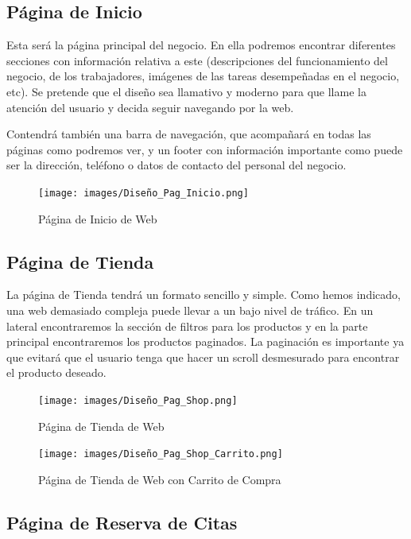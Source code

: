\subsection{Página de Inicio}

Esta será la página principal del negocio. En ella podremos encontrar diferentes secciones con información relativa a este (descripciones del funcionamiento del negocio, de los trabajadores, imágenes de las tareas desempeñadas en el negocio, etc). Se pretende que el diseño sea llamativo y moderno para que llame la atención del usuario y decida seguir navegando por la web.

Contendrá también una barra de navegación, que acompañará en todas las páginas como podremos ver, y un footer con información importante como puede ser la dirección, teléfono o datos de contacto del personal del negocio.

\begin{figure}[H]
  \centering
  \texttt{[image: images/Diseño\_Pag\_Inicio.png]}
  \caption{Página de Inicio de Web}
  \label{}
\end{figure}

\subsection{Página de Tienda}

La página de Tienda tendrá un formato sencillo y simple. Como hemos indicado, una web demasiado compleja puede llevar a un bajo nivel de tráfico. En un lateral encontraremos la sección de filtros para los productos y en la parte principal encontraremos los productos paginados. La paginación es importante ya que evitará que el usuario tenga que hacer un scroll desmesurado para encontrar el producto deseado.

\begin{figure}[H]
  \centering
  \texttt{[image: images/Diseño\_Pag\_Shop.png]}
  \caption{Página de Tienda de Web}
  \label{}
\end{figure}

\begin{figure}[H]
  \centering
  \texttt{[image: images/Diseño\_Pag\_Shop\_Carrito.png]}
  \caption{Página de Tienda de Web con Carrito de Compra}
  \label{}
\end{figure}

\subsection{Página de Reserva de Citas}


